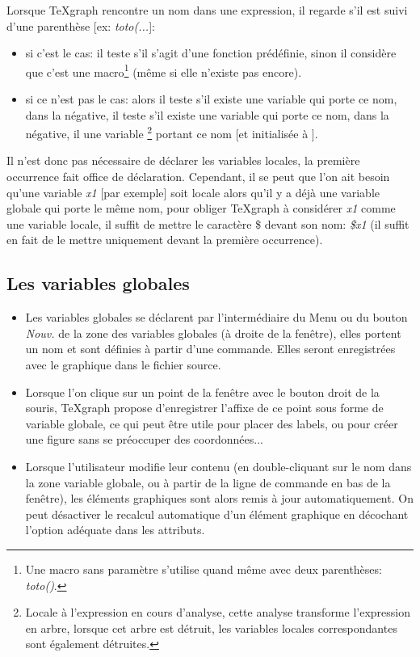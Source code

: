 Lorsque TeXgraph rencontre un nom dans une expression, il regarde s'il est suivi d'une parenthèse [ex: \textsl{toto(...}]:

\begin{itemize}
\item si c'est le cas: il teste s'il s'agit d'une fonction prédéfinie, sinon il considère que c'est une macro\footnote{Une macro sans paramètre s'utilise quand même avec deux parenthèses: \textsl{toto()}.} (même si elle n'existe pas encore).

\item si ce n'est pas le cas: alors il teste  s'il existe une variable  qui porte ce nom, dans la négative, il teste s'il existe une variable  qui porte ce nom, dans la négative, il  une variable \footnote{Locale à l'expression en cours d'analyse, cette analyse transforme l'expression en arbre, lorsque cet arbre est détruit, les variables locales correspondantes sont également détruites.} portant ce nom [et initialisée à \Nil].
\end{itemize}


Il n'est donc pas nécessaire de déclarer les variables locales, la première occurrence fait office de déclaration. Cependant, il se peut que l'on ait besoin qu'une variable \textsl{x1} [par exemple] soit locale alors qu'il y a déjà une variable globale qui porte le même nom, pour obliger TeXgraph à considérer \textsl{x1} comme une variable locale, il suffit de mettre le caractère \$ devant son nom: \textsl{\$x1} (il suffit en fait de le mettre uniquement devant la première occurrence).

\subsection{Les variables globales}\label{varglob}

\begin{itemize}
\item Les variables globales se déclarent par l'intermédiaire du Menu ou du bouton \textsl{Nouv.} de la zone des
variables globales (à droite de la fenêtre), elles portent un nom et sont définies à partir d'une commande. Elles seront
enregistrées avec le graphique dans le fichier source.

\item Lorsque l'on clique sur un point de la fenêtre avec le bouton droit de la souris, TeXgraph propose d'enregistrer l'affixe de ce point sous forme de variable globale, ce qui peut être utile pour placer des labels, ou pour créer une figure sans se préoccuper des coordonnées...

\item Lorsque l'utilisateur modifie leur contenu (en double-cliquant sur le nom dans la zone variable globale, ou  à partir de la ligne de commande en bas de la fenêtre), les éléments graphiques sont alors remis à jour automatiquement. On peut désactiver le recalcul automatique d'un élément graphique en décochant l'option adéquate dans les attributs.

\end{itemize}
 
